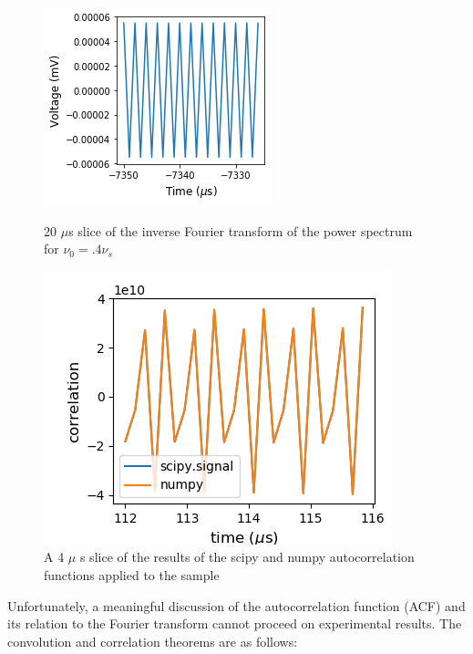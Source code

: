 \documentclass[a4paper]{article}
\begin{document}
\begin{figure}
\centering
\begin{minipage}{.5\textwidth}
	\centering
	\includegraphics[width=.8\linewidth]{5-3/dft_idft}
	\caption{20 $\mu$s slice of the inverse Fourier \hfill \break transform of the power spectrum for $\nu_0 = .4 \nu_s$}
	\label{fig:inverse}
\end{minipage}%
\begin{minipage}{.5\textwidth}
	\centering
	\includegraphics[width=.8\linewidth]{5-3/ACF}
	\caption{A 4 $\mu$ s slice of the results of the \hfill \break scipy and numpy autocorrelation functions \hfill \break applied to the sample}
	\label{fig:ACF}
\end{minipage}
\end{figure}

Unfortunately, a meaningful discussion of the autocorrelation function (ACF) and its relation to the Fourier transform cannot proceed on experimental results. The convolution and correlation theorems are as follows:
\end{document}
